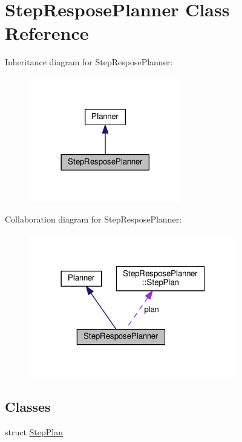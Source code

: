 \hypertarget{classStepResposePlanner}{}\section{Step\+Respose\+Planner Class Reference}
\label{classStepResposePlanner}


Inheritance diagram for Step\+Respose\+Planner\+:\nopagebreak
\begin{figure}[H]
\begin{center}
\leavevmode
\includegraphics[width=189pt]{d5/d1c/classStepResposePlanner__inherit__graph}
\end{center}
\end{figure}


Collaboration diagram for Step\+Respose\+Planner\+:\nopagebreak
\begin{figure}[H]
\begin{center}
\leavevmode
\includegraphics[width=258pt]{d6/de2/classStepResposePlanner__coll__graph}
\end{center}
\end{figure}
\subsection*{Classes}
\begin{DoxyCompactItemize}
\item 
struct \hyperlink{structStepResposePlanner_1_1StepPlan}{Step\+Plan}
\end{DoxyCompactItemize}
